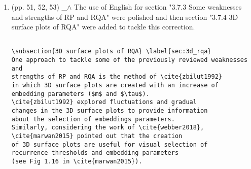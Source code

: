 \documentclass[12pt]{article}
\begin{document}
\begin{enumerate}

\item  (pp. 51, 52, 53)  \_$\wedge$  
	The use of English for section "3.7.3 Some weaknesses and strengths of RP and RQA" 
	were polished  and then section "3.7.4 3D surface plots of RQA" were added to tackle this correction.

	\begin{verbatim}

\subsection{3D surface plots of RQA} \label{sec:3d_rqa}
One approach to tackle some of the previously reviewed weaknesses and 
strengths of RP and RQA is the method of \cite{zbilut1992} 
in which 3D surface plots are created with an increase of 
embedding parameters ($m$ and $\tau$). 
\cite{zbilut1992} explored fluctuations and gradual 
changes in the 3D surface plots to provide information 
about the selection of embeddings parameters. 
Similarly, considering the work of \cite{webber2018}, 
\cite{marwan2015} pointed out that the creation 
of 3D surface plots are useful for visual selection of 
recurrence thresholds and embedding parameters 
(see Fig 1.16 in \cite{marwan2015}). 


\end{verbatim}
\end{enumerate}
\end{document}
